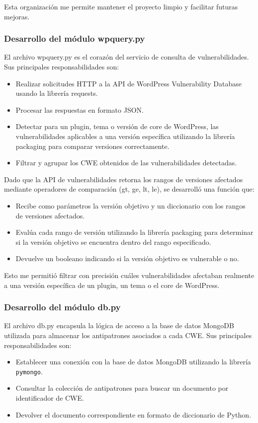 Esta organización me permite mantener el proyecto limpio y facilitar futuras mejoras.

\subsubsection{Desarrollo del módulo wpquery.py}

El archivo wpquery.py es el corazón del servicio de consulta de vulnerabilidades.
Sus principales responsabilidades son:
\begin{itemize}
    \item Realizar solicitudes HTTP a la API de WordPress Vulnerability Database usando la librería requests.
    \item Procesar las respuestas en formato JSON.
    \item Detectar para un plugin, tema o versión de core de WordPress, las vulnerabilidades aplicables a una versión específica utilizando la librería packaging para comparar versiones correctamente.
    \item Filtrar y agrupar los CWE obtenidos de las vulnerabilidades detectadas.
\end{itemize}

Dado que la API de vulnerabilidades retorna los rangos de versiones afectados mediante operadores de comparación (gt, ge, lt, le), se desarrolló una función que:
\begin{itemize}
    \item Recibe como parámetros la versión objetivo y un diccionario con los rangos de versiones afectados.
    \item Evalúa cada rango de versión utilizando la librería packaging para determinar si la versión objetivo se encuentra dentro del rango especificado.
    \item Devuelve un booleano indicando si la versión objetivo es vulnerable o no.
\end{itemize}

Esto me permitió filtrar con precisión cuáles vulnerabilidades afectaban realmente a una versión específica de un plugin, un tema o el core de WordPress.

\subsubsection{Desarrollo del módulo db.py}
El archivo db.py encapsula la lógica de acceso a la base de datos MongoDB utilizada para almacenar los antipatrones asociados a cada CWE.
Sus principales responsabilidades son:
\begin{itemize}
\item Establecer una conexión con la base de datos MongoDB utilizando la librería \texttt{pymongo}.
\item Consultar la colección de antipatrones para buscar un documento por identificador de CWE.
\item Devolver el documento correspondiente en formato de diccionario de Python.
\end{itemize}

